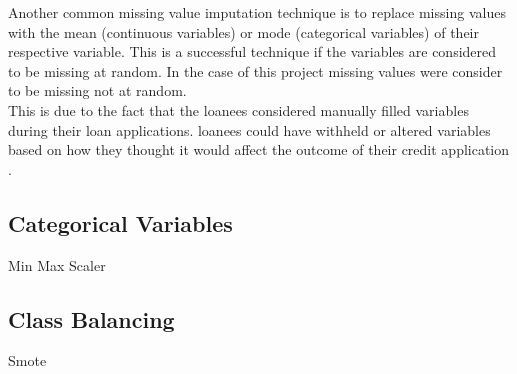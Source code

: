 Another common missing value imputation technique is to replace missing values with the mean (continuous variables) or mode (categorical variables) of their respective variable. This is a successful technique if the variables are considered to be missing at random. In the case of this project missing values were consider to be missing not at random.  \\


This is due to the fact that the loanees considered manually filled variables during their loan applications. loanees could have withheld or altered variables based on how they thought it would affect the outcome of their credit application \parencite{MissingValuesBos}.  


\subsection{Categorical Variables}

Min Max Scaler

\subsection{Class Balancing}

Smote 